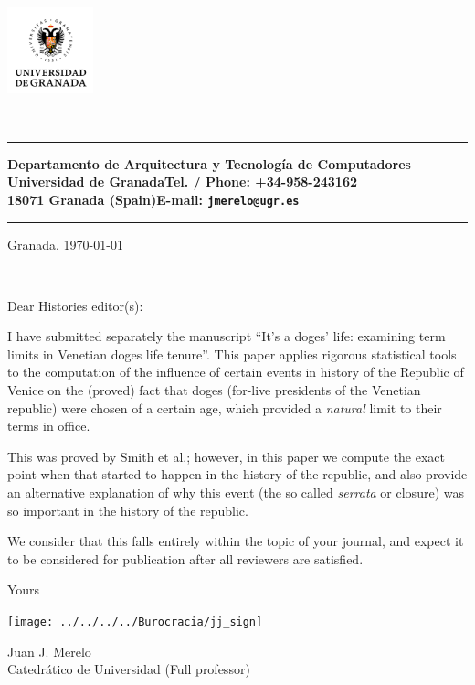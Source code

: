 \documentclass{letter}
\makeatletter
\def\email{\tt jmerelo@ugr.es}
\def\tel{+34-958-243162}
\def\granada{18071 Granada (Spain)}
\def\ucm{Universidad de Granada}
\def\dpto{Departamento de Arquitectura y Tecnolog\'ia de Computadores}
\def\cabecera{

\begin{minipage}{2.5cm}
  \centerline{  \includegraphics[width=2.5cm,height=2.5cm]{UGR-MARCA-01-color} }
\end{minipage}
\ \
\begin{minipage}{13cm}
 \rule{13cm}{0.6mm}
 \vspace*{0.3cm}
 {\small{\bf \dpto \hfill}} \\
 {\footnotesize{\bf \ucm \hfill Tel. / Phone: \tel}} \\
 {\footnotesize{\bf \granada \hfill E-mail: \email}}\\
 \rule{13cm}{0.6mm}
\end{minipage}
}
\makeatother
\begin{document}
\cabecera 

\vspace{0.5cm}

\hspace{7cm}

\hfill Granada, \today

\vspace{0.5cm}
\ \
{
\begin{minipage}[t]{9cm}
Dear Histories editor(s):
\end{minipage}
 }

\vspace{0.5cm}



\begin{flushleft}

I have submitted separately the manuscript ``It's a doges' life: examining term
limits in Venetian doges life tenure''. This paper applies rigorous statistical
tools to the computation of the influence of certain events in history of the
Republic of Venice on the (proved) fact that doges (for-live presidents of the
Venetian republic) were chosen of a certain age, which provided a \emph{natural}
limit to their terms in office.

This was proved by Smith et al.; however, in this paper we compute the exact
point when that started to happen in the history of the republic, and also
provide an alternative explanation of why this event (the so called
\emph{serrata} or closure) was so important in the history of the republic.

We consider that this falls entirely within the topic of your journal, and
expect it to be considered for publication after all reviewers are satisfied.

\end{flushleft}



\hspace*{8cm} Yours  \\

\centerline{\texttt{[image: ../../../../Burocracia/jj\_sign]}}

\hspace*{8cm} Juan J. Merelo\\
\hspace*{8cm} Catedrático de Universidad (Full professor)
\end{document}
